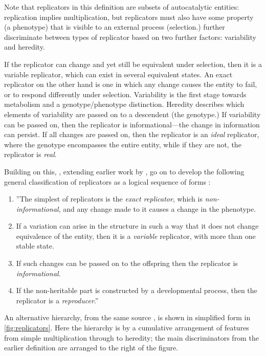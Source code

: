 Note that replicators in this definition are subsets of autocatalytic entities: replication implies multiplication, but replicators must also have some property (a phenotype) that is visible to an external process (selection.)  further discriminate between types of replicator based on two further factors: variability and heredity. 

If the replicator can change and yet still be equivalent under selection, then it is a variable replicator, which can exist in several equivalent states. An exact replicator on the other hand is one in which any change causes the entity to fail, or to respond differently under selection. Variability is the first stage towards metabolism and a genotype/phenotype distinction. Heredity describes which elements of variability are passed on to a descendent (the genotype.) If variability can be passed on, then the replicator is informational---the change in information can persist. If all changes are passed on, then the replicator is an \emph{ideal} replicator, where the genotype encompasses the entire entity, while if they are not, the replicator is \emph{real}.

Building on this, \citeauthor{Zachar2010}, extending earlier work by \textcite{Szathmary1999,Szathmary:2006ty}, go on to develop the following general classification of replicators as a logical sequence of forms \parencite[p.21, line breaks and numbering added for emphasis]{Zachar2010}:  

\begin{enumerate}
	\item ''The simplest of replicators is the \emph{exact replicator}, which is \emph{non-informational}, and any change made to it causes a change in the phenotype. 
	\item If a variation can arise in the structure in such a way that it does not change equivalence of the entity, then it is a \emph{variable} replicator, with more than one stable state.
	\item If such changes can be passed on to the offspring then the replicator is \emph{informational}. 
	\item If the non-heritable part is constructed by a developmental process, then the replicator is a \emph{reproducer}.'' 
\end{enumerate}

An alternative hierarchy, from the same source \parencite{Zachar2010}, is shown in simplified form in \cref{fig:replicators}. Here the hierarchy is by a cumulative arrangement of features from simple multiplication through to heredity; the main discriminators from the earlier definition are arranged to the right of the figure.

